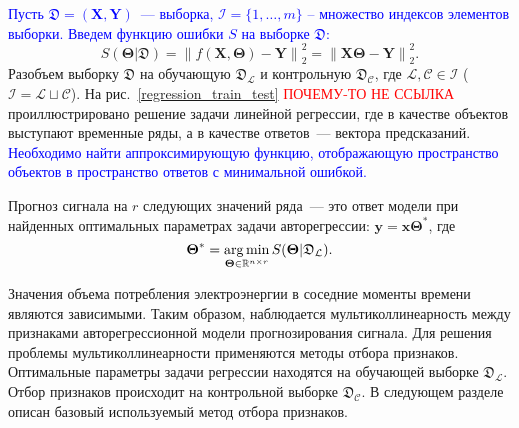 \documentclass[12pt,twoside]{article}
\newcommand{\bY}{\mathbf{Y}}
\newcommand{\bX}{\mathbf{X}}
\newcommand{\bTheta}{\boldsymbol{\Theta}}
\begin{document}
\textcolor{blue}{Пусть $\mathfrak{D}= \left( \bX, \bY \right)$~--- выборка, $\mathcal{I} = \{1, \ldots, m\}$ -- множество индексов элементов выборки. Введем  функцию ошибки $S$ на выборке $\mathfrak{D}$:}
$$S(\bTheta | \mathfrak{D}) = {\bigl\| f(\mathbf{X},  \bTheta) - \mathbf{Y} \bigr\| }_2^2 =  {\bigl\| \mathbf{X}\bTheta - \mathbf{Y} \bigr\| }_2^2.$$
Разобъем выборку $\mathfrak{D}$ на обучающую $\mathfrak{D}_{\mathcal{L}}$ и контрольную $\mathfrak{D}_{\mathcal{C}}$, где $\mathcal{L}, \mathcal{C} \in \mathcal{I}$ ($\mathcal{I} = \mathcal{L} \sqcup \mathcal{C}$). На рис.~\ref{regression_train_test} \textcolor{red}{ПОЧЕМУ-ТО НЕ ССЫЛКА} проиллюстрировано решение задачи линейной регрессии, где в качестве объектов выступают временные ряды, а в качестве ответов~--- вектора предсказаний. \textcolor{blue}{Необходимо найти аппроксимирующую функцию, отображающую пространство объектов в пространство ответов с минимальной ошибкой.} 



Прогноз сигнала на $r$ следующих значений ряда~--- это ответ модели при найденных оптимальных параметрах задачи авторегрессии: $\mathbf{y} = \mathbf{x}\bTheta^*$, где 
$$ {\bTheta}^{*} = \argmin_{\bTheta \in \mathbb{R}^{n \times r}} S(\bTheta | \mathfrak{D}_\mathcal{L}).$$
 

Значения объема потребления электроэнергии в соседние моменты времени являются зависимыми.
Таким образом, наблюдается мультиколлинеарность между признаками авторегрессионной модели прогнозирования сигнала. 
Для решения проблемы мультиколлинеарности применяются методы отбора признаков. Оптимальные параметры задачи регрессии находятся на обучающей выборке $\mathfrak{D}_\mathcal{L}$. 
Отбор признаков происходит на контрольной выборке $\mathfrak{D}_\mathcal{C}$. В следующем разделе описан базовый используемый метод отбора признаков.
\end{document}
